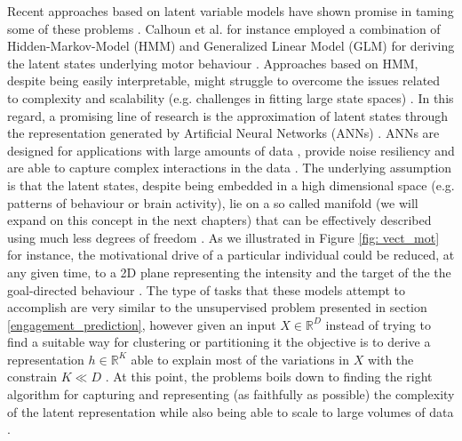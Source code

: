 Recent approaches based on latent variable models have shown promise in taming some of these problems \cite{calhoun2019unsupervised}. Calhoun et al. for instance employed a combination of Hidden-Markov-Model (HMM) and Generalized Linear Model (GLM) for deriving the latent states underlying motor behaviour \cite{calhoun2019unsupervised}. Approaches based on HMM, despite being easily interpretable, might struggle to overcome the issues related to complexity  \cite{eyjolfsdottir2016learning,schuster2007introduction} and scalability (e.g. challenges in fitting large state spaces) \cite{touloupou2020scalable}. In this regard, a promising line of research is the approximation of latent states through the representation generated by Artificial Neural Networks (ANNs) \cite{eyjolfsdottir2016learning,song2017reward,merel2019deep,luxem2020identifying, pereira2020quantifying, mccullough2021unsupervised, shi2021learning}. ANNs are designed for applications with large amounts of data \cite{oh2004gpu}, provide noise resiliency and are able to capture complex interactions in the data \cite{bengio2017deep}. The underlying assumption is that the latent states, despite being embedded in a high dimensional space (e.g. patterns of behaviour or brain activity), lie on a so called manifold (we will expand on this concept in the next chapters) that can be effectively described using much less degrees of freedom \cite{seung2000manifold, pang2016dimensionality, luxem2020identifying}. As we illustrated in Figure \ref{fig: vect_mot} for instance, the motivational drive of a particular individual could be reduced, at any given time, to a 2D plane representing the intensity and the target of the the goal-directed behaviour \cite{simpson2016behavioral}. The type of tasks that these models attempt to accomplish are very similar to the unsupervised problem presented in section \ref{engagement_prediction}, however given an input $X \in \mathbb{R}^{D}$ instead of trying to find a suitable way for clustering or partitioning it the objective is to derive a representation $h \in \mathbb{R}^{K}$ able to explain most of the variations in $X$ with the constrain $K \ll D$ \cite{bishop2006pattern,murphy2022probabilistic}. At this point, the problems boils down to finding the right algorithm for capturing and representing (as faithfully as possible) the complexity of the latent representation \cite{eyjolfsdottir2016learning,schuster2007introduction} while also being able to scale to large volumes of data \cite{touloupou2020scalable}. 

